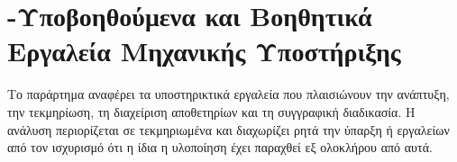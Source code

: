 \chapter{-Υποβοηθούμενα και Βοηθητικά Εργαλεία Μηχανικής Υποστήριξης}
\label{app:ai_support_tooling}

Το παράρτημα αναφέρει τα υποστηρικτικά εργαλεία που πλαισιώνουν την ανάπτυξη, την τεκμηρίωση,
τη διαχείριση αποθετηρίων και τη συγγραφική διαδικασία. Η ανάλυση περιορίζεται σε τεκμηριωμένα
 και διαχωρίζει ρητά την ύπαρξη  ή  εργαλείων
από τον ισχυρισμό ότι η ίδια η υλοποίηση έχει παραχθεί εξ ολοκλήρου από αυτά.



